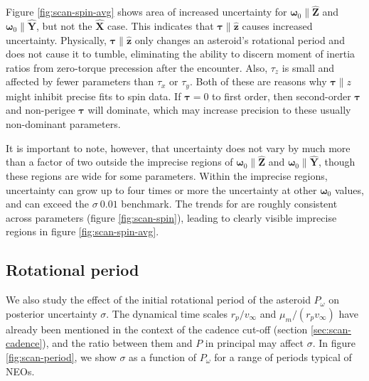 \documentclass[fleqn,usenatbib]{mnras}
\newcommand{\unit}[1]{\bm{\hat{#1}}}
\begin{document}
Figure \ref{fig:scan-spin-avg} shows area of increased uncertainty for $\bm \omega_0 \parallel \unit Z$ and $\bm \omega_0 \parallel \unit Y$, but not the $\unit X$ case. This indicates that $\bm \tau \parallel \unit z$ causes increased uncertainty. Physically, $\bm \tau \parallel \unit z$ only changes an asteroid's rotational period and does not cause it to tumble, eliminating the ability to discern moment of inertia ratios from zero-torque precession after the encounter. Also, $\tau_z$ is small and affected by fewer parameters than $\tau_x$ or $\tau_y$.  Both of these are reasons why $\bm \tau \parallel z$ might inhibit precise fits to spin data. If $\bm \tau = 0$ to first order, then second-order $\bm \tau$ and non-perigee $\bm \tau$ will dominate, which may increase precision to these usually non-dominant parameters.

It is important to note, however, that uncertainty does not vary by much more than a factor of two outside the imprecise regions of $\bm \omega_0 \parallel \unit Z$ and $\bm \omega_0 \parallel \unit Y$, though these regions are wide for some parameters. Within the imprecise regions, uncertainty can grow up to four times or more the uncertainty at other $\bm \omega_0$ values, and can exceed the $\sigma ~0.01$ benchmark. The trends for are roughly consistent across parameters (figure \ref{fig:scan-spin}), leading to clearly visible imprecise regions in figure \ref{fig:scan-spin-avg}.




\subsection{Rotational period}
\label{sec:scan-period}

We also study the effect of the initial rotational period of the asteroid $P_\omega$ on posterior uncertainty $\sigma$. The dynamical time scales $r_p/v_\infty$ and $\mu_m / (r_p v_\infty)$ have already been mentioned in the context of the cadence cut-off (section \ref{sec:scan-cadence}), and the ratio between them and $P$ in principal may affect $\sigma$. In figure \ref{fig:scan-period}, we show $\sigma$ as a function of $P_\omega$ for a range of periods typical of NEOs.
\end{document}
